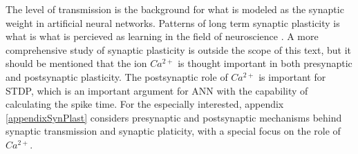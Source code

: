 The level of transmission is the background for what is modeled as the synaptic weight in artificial neural networks.
Patterns of long term synaptic plasticity is what is what is percieved as learning in the field of neuroscience \cite{NeuroscienceExploringTheBrain3edKAP25}.
A more comprehensive study of synaptic plasticity is outside the scope of this text, but it should be mentioned that the ion $Ca^{2+}$ is thought important in both presynaptic and postsynaptic plasticity.
The postsynaptic role of $Ca^{2+}$ is important for STDP, which is an important argument for ANN with the capability of calculating the spike time.
For the especially interested, appendix \ref{appendixSynPlast} considers presynaptic and postsynaptic mechanisms behind synaptic transmission and synaptic platicity, with a special focus on the role of $Ca^{2+}$.























